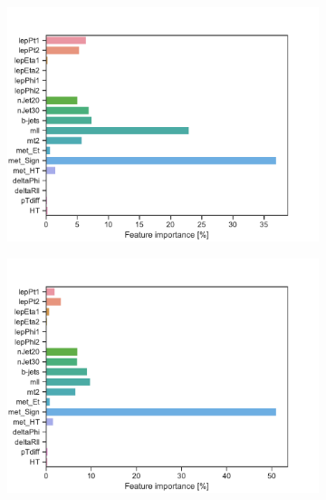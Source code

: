 \begin{figure}[H]
    \centering
    \begin{subfigure}[t!]{0.49\textwidth}
        \includegraphics[width = \textwidth]{Figures/SlepSlep/ML/BDT/All_level/Inter/featureImportance.pdf}
        \caption{}
        \label{fig:featSlepslepLow}
    \end{subfigure}
    \begin{subfigure}[t!]{0.49\textwidth}
        \includegraphics[width = \textwidth]{Figures/SlepSnu/BDT/All_level/Inter/featureImportance.pdf}
        \caption{}
        \label{fig:featSlepsnuLow}
    \end{subfigure}
    \begin{subfigure}[t!]{0.49\textwidth}

\end{subfigure}
\end{figure}
